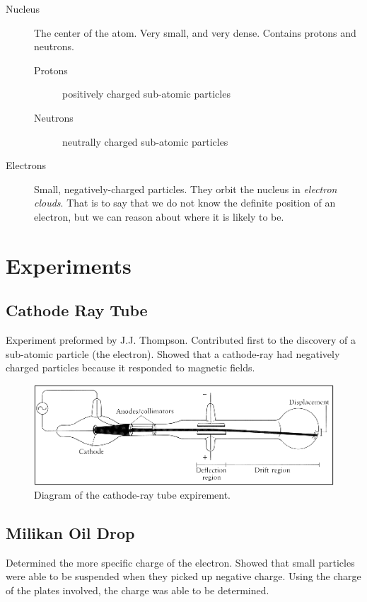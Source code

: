 \begin{description}
  \item[Nucleus] The center of the atom.  Very small, and very dense.  Contains
    protons and neutrons.
    \begin{description}
      \item[Protons] positively charged sub-atomic particles
      \item[Neutrons] neutrally charged sub-atomic particles
    \end{description}
  \item[Electrons] Small, negatively-charged particles.  They orbit the nucleus
    in \textit{electron clouds}.  That is to say that we do not know the
    definite position of an electron, but we can reason about where it is likely
    to be.
\end{description}

\section{Experiments}
\subsection{Cathode Ray Tube}
Experiment preformed by J.J. Thompson.  Contributed first to the discovery of a
sub-atomic particle (the electron).  Showed that a cathode-ray had negatively
charged particles because it responded to magnetic fields.

\begin{figure}[H]
  \centering
  \includegraphics{res/crt_experiment.png}
  \caption{Diagram of the cathode-ray tube expirement.}
\end{figure}

\subsection{Milikan Oil Drop}
Determined the more specific charge of the electron.  Showed that small
particles were able to be suspended when they picked up negative charge.  Using
the charge of the plates involved, the charge was able to be determined.


